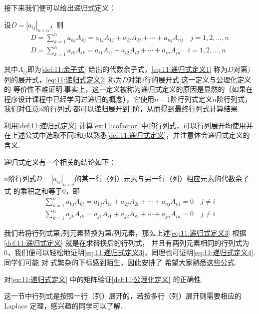 接下来我们便可以给出递归式定义：
\begin{definition} \label{def:11:递归式定义}
    设$D=|a_{ij}|_{n \times n}$，则
    \begin{gather}
        \label{eq:11:递归式定义1}
        D=\sum_{k=1}^{n}a_{kj}A_{kj}=a_{1j}A_{1j}+a_{2j}A_{2j}+\cdots+a_{nj}A_{nj} \quad j=1,2,\ldots,n \\
        \label{eq:11:递归式定义2}
        D=\sum_{k=1}^{n}a_{ik}A_{ik}=a_{i1}A_{i1}+a_{i2}A_{i2}+\cdots+a_{in}A_{in} \quad i=1,2,\ldots,n
    \end{gather}
\end{definition}
其中$A_{ij}$即为\autoref{def:11:余子式} 给出的代数余子式，\autoref{eq:11:递归式定义1} 称为$D$对第$j$列的展开式，\autoref{eq:11:递归式定义2} 称为$D$对第$i$行的展开式.这一定义与公理化定义的
等价性不难证明.事实上，这一定义被称为递归式定义的原因是显然的（如果在程序设计课程中已经学习过递归的概念），它使用$n-1$阶行列式定义$n$阶行列式，我们对任意$n$阶行列式
都可以递归展开到1阶，从而得到最终行列式计算结果.
\begin{example} \label{ex:11:递归式定义}
    利用\autoref{def:11:递归式定义} 计算\autoref{ex:11:cofactor} 中的行列式，可以行列展开均使用并在上述公式中选取不同$i$和$j$以熟悉\autoref*{def:11:递归式定义}，并注意体会递归式定义的含义.
\end{example}

递归式定义有一个相关的结论如下：
\begin{theorem}
    $n$阶行列式$D=|a_{ij}|_{n \times n}$的某一行（列）元素与另一行（列）相应元素的代数余子式
    的乘积之和等于0，即
    \begin{gather}
        \label{eq:11:递归式定义3}
        \sum_{k=1}^{n}a_{kj}A_{ki}=a_{1j}A_{1i}+a_{2j}A_{2i}+\cdots+a_{nj}A_{ni}=0 \quad j \neq i \\
        \label{eq:11:递归式定义4}
        \sum_{k=1}^{n}a_{jk}A_{ik}=a_{j1}A_{i1}+a_{j2}A_{i2}+\cdots+a_{jn}A_{in}=0 \quad j \neq i
    \end{gather}
\end{theorem}
我们若将行列式第$j$列元素替换为第$i$列元素，那么上述\autoref{eq:11:递归式定义3} 根据\autoref{def:11:递归式定义} 就是在求替换后的行列式，
并且有两列元素相同的行列式为0，我们便可以轻松地证明\autoref*{eq:11:递归式定义3}，同理也可证明\autoref*{eq:11:递归式定义4}. 同学们可能
对 式繁杂的下标感到陌生，因此安排了 希望大家熟悉这些公式.
\begin{example} \label{ex:11:递归式定义2}
    对\autoref{ex:11:递归式定义} 中的矩阵验证\autoref{def:11:公理化定义} 的正确性.
\end{example}
这一节中行列式是按照一行（列）展开的，若按多行（列）展开则需要相应的 Laplace 定理，感兴趣的同学可以了解.
